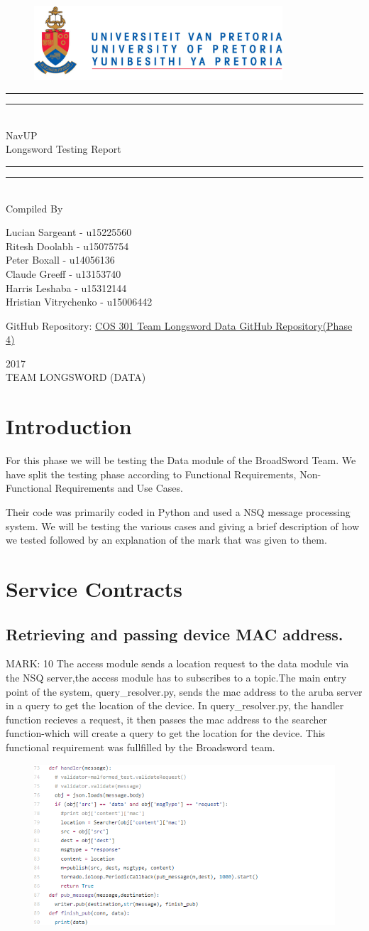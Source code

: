 \documentclass{article}
\newcommand*{\titleGP}{\begingroup
		\begin{figure}[t]
			\centering
			\includegraphics[width=350px]{UP_Logo.PNG}
		\end{figure}
\centering 
\vspace*{\baselineskip}

\rule{\textwidth}{1.6pt}\vspace*{-\baselineskip}\vspace*{2pt}
\rule{\textwidth}{0.4pt}\\[\baselineskip]

{\LARGE NavUP\\ [0.3\baselineskip] Longsword Testing Report } \\ [0.2\baselineskip]
\rule{\textwidth}{0.4pt}\vspace*{-\baselineskip}\vspace{3.2pt}
\rule{\textwidth}{1.6pt}\\[\baselineskip] %



Compiled By \\[\baselineskip]
{\Large Lucian Sargeant - u15225560 \\ Ritesh Doolabh - u15075754 \\ Peter Boxall -  u14056136 \\ Claude Greeff - u13153740\\ Harris Leshaba - u15312144 \\ Hristian Vitrychenko - u15006442\par}

\bigskip
\bigskip

 	GitHub Repository:  
 	\href{https://github.com/Chris19951225/COS-301-Longsword-Data-Streaming}{COS 301 Team Longsword Data GitHub Repository(Phase 4)}




 

\vfill


{\scshape 2017} \\[0.3\baselineskip]
{\large TEAM LONGSWORD (DATA)}\par

\endgroup}
\begin{document}
\titleGP
\newpage
\tableofcontents

\newpage
\section{Introduction}
\begin{flushleft}
For this phase we will be testing the Data module of the BroadSword Team. We have split the testing phase according to Functional Requirements, Non-Functional Requirements and Use Cases. 
\end{flushleft}

\begin{flushleft}
Their code was primarily coded in Python and used a NSQ message processing system.
We will be testing the various cases and giving a brief description of how we tested followed by an explanation of the mark that was given to them.
\end{flushleft}


\section{Service Contracts}

\subsection{Retrieving and passing device MAC address.}
MARK: 10
The access module sends a location request to the data module via the NSQ server,the access module has to subscribes to a topic.The main entry point of the system, query\_resolver.py, sends the mac address to the aruba server in a query to get the location of the device.
In query\_resolver.py, the handler function recieves a request, it then passes the mac address to the searcher function-which will create a query to get the location for the device.
This functional requirement was fullfilled by the Broadsword team.
\begin{figure}[t]
	\centering
	\includegraphics{handler.PNG}
\end{figure}
\end{document}
